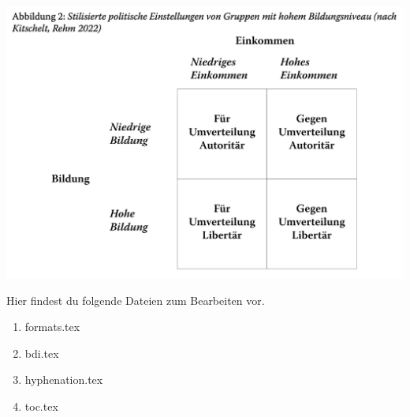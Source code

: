 \documentclass{article}
\begin{document}
\begin{center}
    \includegraphics[scale=0.4]{bilder.png}
\end{center}


Hier findest du folgende Dateien zum Bearbeiten vor. 

\begin{enumerate}
    \item formats.tex
    \item bdi.tex
    \item hyphenation.tex
    \item toc.tex
\end{enumerate}
\end{document}
